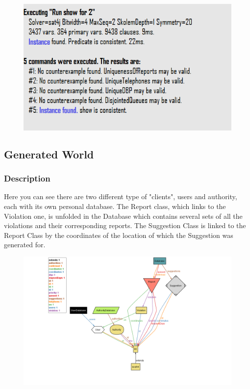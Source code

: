 \documentclass[12pt,a4paper]{article}
\begin{document}
			\begin{figure}[H]
				\centering
				\includegraphics[width=0.9\linewidth]{../assets/images/exports/user/Check.png}
				\label{fig:check}
			\end{figure}
\newpage
\subsection{Generated World}
\subsubsection{Description}
Here you can see there are two different type of "clients", users and authority, each with its own personal database.\newline
The Report class, which links to the Violation one, is unfolded in the Database which contains several sets of all the violations and their corresponding reports. The Suggestion Class is linked to the Report Class by the coordinates of the location of which the Suggestion was generated for.
\begin{figure}[H]
				\centering
				\includegraphics[width=1.5\linewidth]{../assets/images/exports/user/MetaModel.png}
				\label{fig:GenWorld}
			\end{figure}
\end{document}

